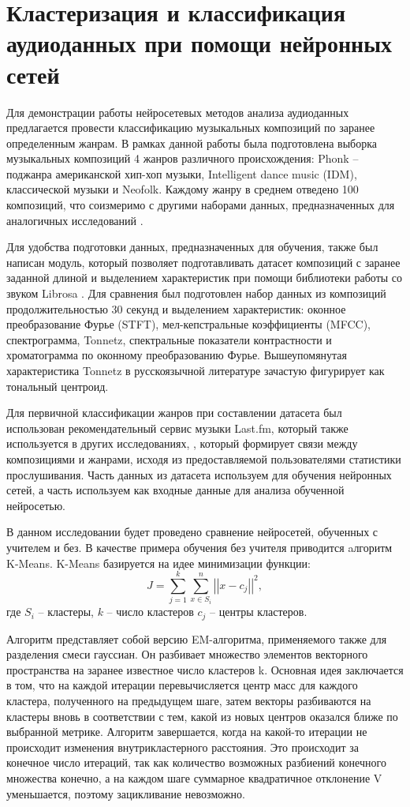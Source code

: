 \chapter{Кластеризация и классификация аудиоданных при помощи нейронных сетей}
Для демонстрации работы нейросетевых методов анализа аудиоданных предлагается провести классификацию музыкальных композиций
по заранее определенным жанрам. В рамках данной работы была подготовлена выборка музыкальных композиций 4 жанров различного происхождения:
Phonk -- поджанра американской хип-хоп музыки, Intelligent dance music (IDM), классической музыки и Neofolk. Каждому жанру в среднем отведено 100 композиций, что соизмеримо с другими наборами данных, предназначенных для аналогичных исследований \cite{gtzan}.

Для удобства подготовки данных, предназначенных для обучения, также был написан модуль, который позволяет подготавливать датасет композиций
с заранее заданной длиной и выделением характеристик при помощи библиотеки работы со звуком Librosa \cite{librosa}. Для сравнения был подготовлен набор данных из
композиций продолжительностью 30 секунд и выделением характеристик: оконное преобразование Фурье (STFT), мел-кепстральные коэффициенты (MFCC), спектрограмма, Tonnetz, спектральные показатели контрастности и хроматограмма по оконному преобразованию Фурье.  Вышеупомянутая характеристика Tonnetz в русскоязычной литературе зачастую фигурирует как тональный центроид.

Для первичной классификации жанров при составлении датасета был использован рекомендательный сервис музыки Last.fm, который также используется в других исследованиях, \cite{lastfm}, который
формирует связи между композициями и жанрами, исходя из предоставляемой пользователями статистики прослушивания.
Часть данных из датасета используем для обучения нейронных сетей, 
а часть используем как входные данные для анализа обученной нейросетью. 

В данном исследовании будет проведено сравнение
нейросетей, обученных с учителем и без. В качестве примера обучения без учителя приводится aлгоритм K-Means.
K-Means базируется на идее минимизации функции:
\begin{equation}
	J = \sum_{j=1}^k \sum_{x \in S_i}^n \left|\left| x - c_j\right|\right|^2,
\end{equation}
где $S_i$ -- кластеры, $k$ -- число кластеров $c_j$ -- центры кластеров.

Алгоритм представляет собой версию EM-алгоритма, применяемого также для разделения смеси гауссиан. Он разбивает множество элементов векторного пространства на заранее известное число кластеров k.
Основная идея заключается в том, что на каждой итерации перевычисляется центр масс для каждого кластера, полученного на предыдущем шаге, затем векторы разбиваются на кластеры вновь в соответствии с тем, какой из новых центров оказался ближе по выбранной метрике.
Алгоритм завершается, когда на какой-то итерации не происходит изменения внутрикластерного расстояния. Это происходит за конечное число итераций, так как количество возможных разбиений конечного множества конечно, а на каждом шаге суммарное квадратичное отклонение V уменьшается, поэтому зацикливание невозможно.

